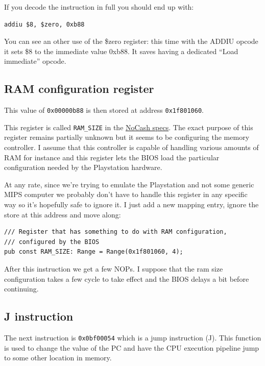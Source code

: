 \documentclass[a4paper]{article}
\newcommand{\code}[1] {\texttt{#1}}
\begin{document}
If you decode the instruction in full you should end up with:

\begin{lstlisting}[language=assembly]
addiu $8, $zero, 0xb88
\end{lstlisting}

You can see an other use of the \$zero register: this time with the
ADDIU opcode it sets \$8 to the immediate value 0xb88. It saves having
a dedicated ``Load immediate'' opcode.

\subsection{RAM configuration register}

This value of \code{0x00000b88} is then stored at address
\code{0x1f801060}.

This register is called \code{RAM\_SIZE} in the
\href{problemkaputt.de/psx-spx.htm#memorycontrol}{NoCash specs}. The
exact purpose of this register remains partially unknown but it seems
to be configuring the memory controller. I assume that this controller
is capable of handling various amounts of RAM for instance and this
register lets the BIOS load the particular configuration needed by the
Playstation hardware.

At any rate, since we're trying to emulate the Playstation and not
some generic MIPS computer we probably don't have to handle this
register in any specific way so it's hopefully safe to ignore it. I
just add a new mapping entry, ignore the store at this address and
move along:

\begin{lstlisting}
/// Register that has something to do with RAM configuration,
/// configured by the BIOS
pub const RAM_SIZE: Range = Range(0x1f801060, 4);
\end{lstlisting}

After this instruction we get a few NOPs. I suppose that the ram size
configuration takes a few cycle to take effect and the BIOS delays a
bit before continuing.

\subsection{J instruction}

The next instruction is \code{0x0bf00054} which is a jump
instruction (J). This function is used to change the value of the PC
and have the CPU execution pipeline jump to some other location in
memory.
\end{document}
